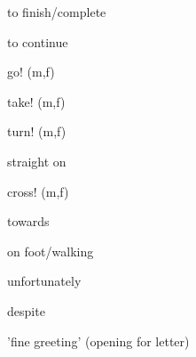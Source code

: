 \documentclass[avery5371,grid,frame]{flashcards}
\begin{document}
\begin{flashcard}{\LARGE to finish/complete}
\LARGE {}
\end{flashcard}
\begin{flashcard}{\LARGE to continue}
\LARGE {}
\end{flashcard}
\begin{flashcard}{\LARGE go! (m,f)}
\LARGE {}
\end{flashcard}
\begin{flashcard}{\LARGE take! (m,f)}
\LARGE {}
\end{flashcard}
\begin{flashcard}{\LARGE turn! (m,f)}
\LARGE {}
\end{flashcard}
\begin{flashcard}{\LARGE straight on}
\LARGE {}
\end{flashcard}
\begin{flashcard}{\LARGE cross! (m,f)}
\LARGE {}
\end{flashcard}
\begin{flashcard}{\LARGE towards}
\LARGE {}
\end{flashcard}
\begin{flashcard}{\LARGE on foot/walking}
\LARGE {}
\end{flashcard}
\begin{flashcard}{\LARGE unfortunately}
\LARGE {}
\end{flashcard}
\begin{flashcard}{\LARGE despite}
\LARGE {}
\end{flashcard}
\begin{flashcard}{\LARGE 'fine greeting' (opening for letter)}
\LARGE {}
\end{flashcard}
\end{document}
